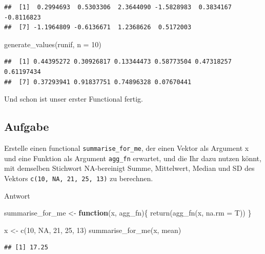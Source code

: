 \documentclass[
]{book}
\newenvironment{Shaded}{\begin{snugshade}}{\end{snugshade}}
\newcommand{\AttributeTok}[1]{\textcolor[rgb]{0.77,0.63,0.00}{#1}}
\newcommand{\ConstantTok}[1]{\textcolor[rgb]{0.00,0.00,0.00}{#1}}
\newcommand{\ControlFlowTok}[1]{\textcolor[rgb]{0.13,0.29,0.53}{\textbf{#1}}}
\newcommand{\DecValTok}[1]{\textcolor[rgb]{0.00,0.00,0.81}{#1}}
\newcommand{\FunctionTok}[1]{\textcolor[rgb]{0.00,0.00,0.00}{#1}}
\newcommand{\NormalTok}[1]{#1}
\newcommand{\OtherTok}[1]{\textcolor[rgb]{0.56,0.35,0.01}{#1}}
\begin{document}
\begin{verbatim}
##  [1]  0.2994693  0.5303306  2.3644090 -1.5828983  0.3834167 -0.8116823
##  [7] -1.1964809 -0.6136671  1.2368626  0.5172003
\end{verbatim}

\begin{Shaded}
\begin{Highlighting}[]
\FunctionTok{generate\_values}\NormalTok{(runif, }\AttributeTok{n =} \DecValTok{10}\NormalTok{)}
\end{Highlighting}
\end{Shaded}

\begin{verbatim}
##  [1] 0.44395272 0.30926817 0.13344473 0.58773504 0.47318257 0.61197434
##  [7] 0.37293941 0.91837751 0.74896328 0.07670441
\end{verbatim}

Und schon ist unser erster Functional fertig.

\hypertarget{aufgabe-11}{%
\subsection{Aufgabe}\label{aufgabe-11}}

Erstelle einen functional \texttt{summarise\_for\_me}, der einen Vektor als Argument x und eine Funktion als Argument \texttt{agg\_fn} erwartet, und die Ihr dazu nutzen könnt, mit demselben Stichwort NA-bereinigt Summe, Mittelwert, Median
und SD des Vektors \texttt{c(10,\ NA,\ 21,\ 25,\ 13)} zu berechnen.

Antwort

\begin{Shaded}
\begin{Highlighting}[]
\NormalTok{summarise\_for\_me }\OtherTok{\textless{}{-}} \ControlFlowTok{function}\NormalTok{(x, agg\_fn)\{}
  \FunctionTok{return}\NormalTok{(}\FunctionTok{agg\_fn}\NormalTok{(x, }\AttributeTok{na.rm =}\NormalTok{ T))}
\NormalTok{\}}

\NormalTok{x }\OtherTok{\textless{}{-}} \FunctionTok{c}\NormalTok{(}\DecValTok{10}\NormalTok{, }\ConstantTok{NA}\NormalTok{, }\DecValTok{21}\NormalTok{, }\DecValTok{25}\NormalTok{, }\DecValTok{13}\NormalTok{)}
\FunctionTok{summarise\_for\_me}\NormalTok{(x, mean)}
\end{Highlighting}
\end{Shaded}

\begin{verbatim}
## [1] 17.25
\end{verbatim}
\end{document}
